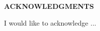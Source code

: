 \vspace*{1in}

\centerline{\large\bf ACKNOWLEDGMENTS}%
\vspace*{1in}

I would like to acknowledge ...%
%

